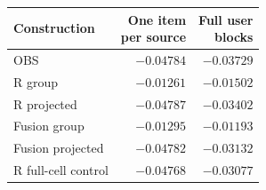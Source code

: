 \begin{tabular}{lrr}
\toprule
Construction & \shortstack{One item\\per source} & \shortstack{Full user\\blocks}\\
\midrule
OBS & $-0.04784$ & $-0.03729$\\
R group & $-0.01261$ & $-0.01502$\\
R projected & $-0.04787$ & $-0.03402$\\
Fusion group & $-0.01295$ & $-0.01193$\\
Fusion projected & $-0.04782$ & $-0.03132$\\
R full-cell control & $-0.04768$ & $-0.03077$\\
\bottomrule
\end{tabular}
